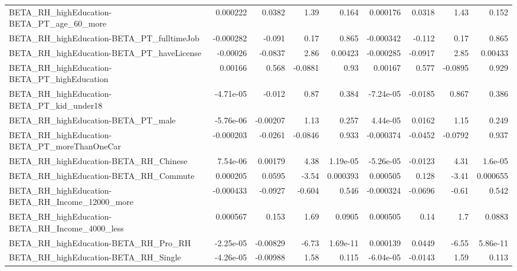\begin{tabular}{lrrrrrrrr}
BETA\_RH\_highEducation-BETA\_PT\_age\_60\_more          &    0.000222 &       0.0382 &      1.39 &    0.164 &   0.000176 &      0.0318 &         1.43 &         0.152 \\
BETA\_RH\_highEducation-BETA\_PT\_fulltimeJob          &   -0.000282 &       -0.091 &      0.17 &    0.865 &  -0.000342 &      -0.112 &         0.17 &         0.865 \\
BETA\_RH\_highEducation-BETA\_PT\_haveLicense          &    -0.00026 &      -0.0837 &      2.86 &  0.00423 &  -0.000285 &     -0.0917 &         2.85 &       0.00433 \\
BETA\_RH\_highEducation-BETA\_PT\_highEducation        &     0.00166 &        0.568 &   -0.0881 &     0.93 &    0.00167 &       0.577 &      -0.0895 &         0.929 \\
BETA\_RH\_highEducation-BETA\_PT\_kid\_under18          &   -4.71e-05 &       -0.012 &      0.87 &    0.384 &  -7.24e-05 &     -0.0185 &        0.867 &         0.386 \\
BETA\_RH\_highEducation-BETA\_PT\_male                 &   -5.76e-06 &     -0.00207 &      1.13 &    0.257 &   4.44e-05 &      0.0162 &         1.15 &         0.249 \\
BETA\_RH\_highEducation-BETA\_PT\_moreThanOneCar       &   -0.000203 &      -0.0261 &   -0.0846 &    0.933 &  -0.000374 &     -0.0452 &      -0.0792 &         0.937 \\
BETA\_RH\_highEducation-BETA\_RH\_Chinese              &    7.54e-06 &      0.00179 &      4.38 & 1.19e-05 &  -5.26e-05 &     -0.0123 &         4.31 &       1.6e-05 \\
BETA\_RH\_highEducation-BETA\_RH\_Commute              &    0.000205 &       0.0595 &     -3.54 & 0.000393 &   0.000505 &       0.128 &        -3.41 &      0.000655 \\
BETA\_RH\_highEducation-BETA\_RH\_Income\_12000\_more    &   -0.000433 &      -0.0927 &    -0.604 &    0.546 &  -0.000324 &     -0.0696 &        -0.61 &         0.542 \\
BETA\_RH\_highEducation-BETA\_RH\_Income\_4000\_less     &    0.000567 &        0.153 &      1.69 &   0.0905 &   0.000505 &        0.14 &          1.7 &        0.0883 \\
BETA\_RH\_highEducation-BETA\_RH\_Pro\_RH               &   -2.25e-05 &     -0.00829 &     -6.73 & 1.69e-11 &   0.000139 &      0.0449 &        -6.55 &      5.86e-11 \\
BETA\_RH\_highEducation-BETA\_RH\_Single               &   -4.26e-05 &     -0.00988 &      1.58 &    0.115 &  -6.04e-05 &     -0.0143 &         1.59 &         0.113 \\

\end{tabular}
